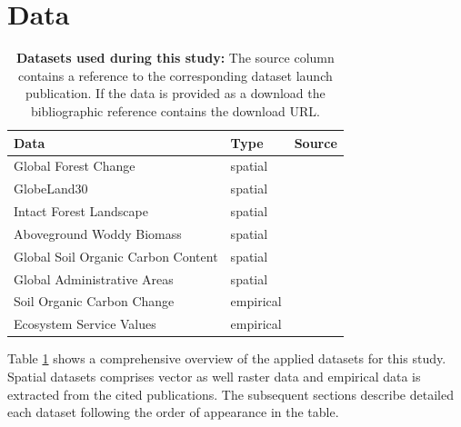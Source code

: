 \section{Data}
\label{sec:data}
	\begin{table}[ht]
		\centering
		\caption[Datasets used during this study]{\textbf{Datasets used during this study:} The source column contains a reference to the corresponding dataset launch publication. If the data is provided as a download the bibliographic reference contains the download URL.}
		\label{tab:datasets}
		\begin{tabular}{lll}
			\hline
			Data & Type & Source \\\hline
			Global Forest Change & spatial & \citet{Hansen2013}\\
			GlobeLand30 & spatial & \citet{Chen2015}\\
			Intact Forest Landscape & spatial & \citet{Potapov2017}\\
			Aboveground Woddy Biomass & spatial & \citet{Baccini2015}\\
			Global Soil Organic Carbon Content & spatial & \citet{FAO2018}\\
			Global Administrative Areas & spatial & \citet{Hijmans2018}\\
			Soil Organic Carbon Change & empirical & \citet{Don2010}\\
			\multirow{3}{*}{Ecosystem Service Values} & \multirow{3}{*}{empirical} & \citet{Groot2012}\\
			&& \citet{Costanza2014}\\
			&& \citet{Siikamaki2015}\\\hline
		\end{tabular}
	\end{table}
	Table \ref{tab:datasets} shows a comprehensive overview of the applied datasets for this study. Spatial datasets comprises vector as well raster data and empirical data is extracted from the cited publications. The subsequent sections describe detailed each dataset following the order of appearance in the table.  

